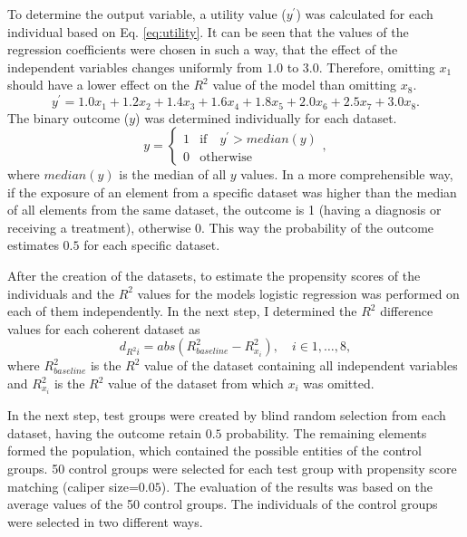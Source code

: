 		To determine the output variable, a utility value ($y^{'}$) was calculated for each individual based on Eq. \ref{eq:utility}. It can be seen that the values of the regression coefficients were chosen in such a way, that the effect of the independent variables changes uniformly from $1.0$ to $3.0$. Therefore, omitting $x_1$ should have a lower effect on the $R^2$ value of the model than omitting $x_8$.	
		\begin{equation}
			y^{'} = 1.0x_1 + 1.2x_2 + 1.4x_3 + 1.6x_4 + 1.8x_5 + 2.0x_6 + 2.5x_7 + 3.0x_8.
			\label{eq:utility}
		\end{equation}
		The binary outcome ($y$) was determined individually for each dataset.
		\begin{equation}
			y=\left\{\begin{matrix}
			1 & \text{if} \quad y^{'}>median(y)\\ 
			0 & \text{otherwise}
			\end{matrix}\right.,
			\label{eq:outcome}
		\end{equation}
		where $median(y)$ is the median of all $y$ values. In a more comprehensible way, if the exposure of an element from a specific dataset was higher than the median of all elements from the same dataset, the outcome is 1 (having a diagnosis or receiving a treatment), otherwise 0. This way the probability of the outcome estimates $0.5$ for each specific dataset.
										
		After the creation of the datasets, to estimate the propensity scores of the individuals and the $R^2$ values for the models logistic regression was performed on each of them independently. In the next step, I determined the $R^2$ difference values for each coherent dataset as
		\begin{equation}
			d_{R^{2}i}=abs(R_{baseline}^{2}-R_{x_i}^{2}), \quad i \in {1,\dots,8},
			\label{eq:rdiff}
		\end{equation}
		where $R_{baseline}^{2}$ is the $R^2$ value of the dataset containing all independent variables and $R_{x_i}^{2}$ is the $R^2$ value of the dataset from which $x_i$ was omitted.
										
		In the next step, test groups were created by blind random selection from each dataset, having the outcome retain $0.5$ probability. The remaining elements formed the population, which contained the possible entities of the control groups. 50 control groups were selected for each test group with propensity score matching (caliper size=$0.05$). The evaluation of the results was based on the average values of the 50 control groups. The individuals of the control groups were selected in two different ways.
		     
